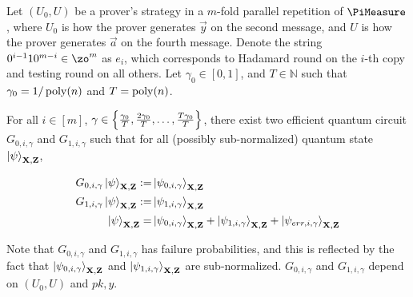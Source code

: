\begin{lemma}\label{lem:partition2}
Let $(U_0,U)$ be a prover's strategy in a $m$-fold parallel repetition of $\PiMeasure$, where $U_0$ is how the prover generates $\vec{y}$ on the second message, and $U$ is how the prover generates $\vec{a}$ on the fourth message. Denote the string $0^{i-1}10^{m-i} \in \zo^m $ as $e_i$, which corresponds to Hadamard round on the $i$-th copy and testing round on all others. Let $\gamma_0 \in[0,1]$, and $T\in \mathbb{N}$ such that $\gamma_0=1/\operatorname*{\operatorname{poly}}(n)$ and $T=\operatorname*{\operatorname{poly}}(n)$. 

 For all $i\in[m]$, $\gamma \in \left\{\frac{\gamma_0}{T},\frac{2\gamma_0}{T},\dots,\frac{T\gamma_0}{T}\right\}$, there exist two efficient quantum circuit $G_{0,i,\gamma}$ and $G_{1,i,\gamma}$ such that for all (possibly sub-normalized)  quantum state $\ket{\psi}_{\mathbf{X},\mathbf{Z}}$,  

\begin{align}
    G_{0,i,\gamma}\ket{\psi}_{\mathbf{X},\mathbf{Z}} :=& \ket{\psi_{0,i,\gamma}}_{\mathbf{X},\mathbf{Z}} \\ G_{1,i,\gamma}\ket{\psi}_{\mathbf{X},\mathbf{Z}} :=& \ket{\psi_{1,i,\gamma}}_{\mathbf{X},\mathbf{Z}}  \\
    \ket{\psi}_{\mathbf{X},\mathbf{Z}} =&   \ket{\psi_{0,i,\gamma}}_{\mathbf{X},\mathbf{Z}}+ \ket{\psi_{1,i,\gamma}}_{\mathbf{X},\mathbf{Z}}+\ket{\psi_{err,i,\gamma}}_{\mathbf{X},\mathbf{Z}}
\end{align}


 

 
  Note that $G_{0,i,\gamma}$ and $G_{1,i,\gamma}$ has failure probabilities, and this is reflected by the fact that $\ket{\psi_{0,i,\gamma}}_{\mathbf{X},\mathbf{Z}}$ and $\ket{\psi_{1,i,\gamma}}_{\mathbf{X},\mathbf{Z}}$ are  sub-normalized. $G_{0,i,\gamma}$ and $G_{1,i,\gamma}$ depend on $(U_0,U)$ and $pk,y$. 
 



\end{lemma}

